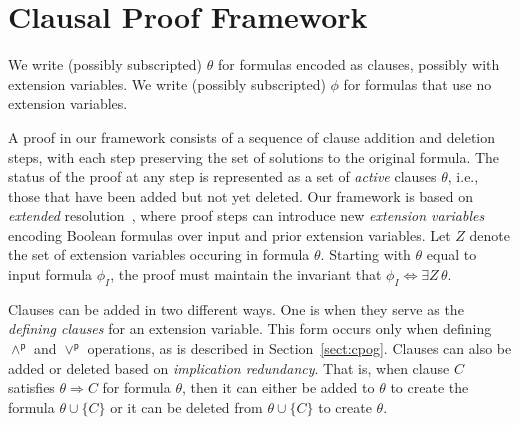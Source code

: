 \documentclass[letterpaper,USenglish,cleveref, autoref, thm-restate]{lipics-v2021}
\newcommand{\pand}{\mathbin{\land^\textsf{p}}}
\newcommand{\por}{\mathbin{\lor^\textsf{p}}}
\newcommand{\imply}{\Rightarrow}
\newcommand{\ifandonlyif}{\Leftrightarrow}
\newcommand{\inputformula}{\phi_I}
\begin{document}
\section{Clausal Proof Framework}

We write (possibly subscripted) $\theta$ for
formulas encoded as clauses, possibly with extension variables.
We write (possibly subscripted)
$\phi$ for formulas
that use no extension variables.

A proof in our framework consists of a sequence of clause addition
and deletion steps, with each step preserving the set of solutions to
the original formula.
The status of the proof at any step is represented as
a set of \emph{active} clauses $\theta$, i.e., those that
have been added but not yet deleted.
Our framework is based
on \emph{extended} resolution~\cite{Tseitin:1983}, where proof
steps can introduce new \emph{extension variables} encoding Boolean formulas over input and prior extension variables.
Let $Z$
denote the set of extension variables occuring in formula $\theta$.
Starting with  $\theta$ equal to input formula $\inputformula$,
the proof must maintain the invariant that
$\inputformula \ifandonlyif \exists Z\,\theta$.

Clauses can be added in two different ways.  One is when they serve as
the \emph{defining clauses} for an extension variable.  This form
occurs only when defining $\pand$ and $\por$ operations, as is
described in Section~\ref{sect:cpog}.  Clauses can also be added or
deleted based on \emph{implication redundancy}.  That is, when clause
$C$ satisfies $\theta \imply C$ for formula $\theta$, then it can either
be added to $\theta$ to create the formula $\theta \cup \{C\}$ or it can be deleted
from $\theta \cup \{C\}$ to create $\theta$.
\end{document}
